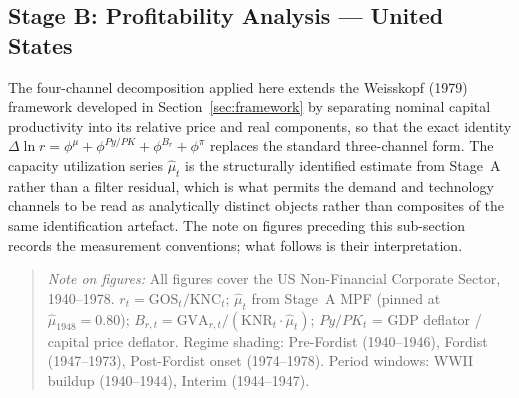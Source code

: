 
\subsection{Stage B: Profitability Analysis — United States}
\label{sec:stageB_us}


The four-channel decomposition applied here extends the Weisskopf (1979)
framework developed in Section~\ref{sec:framework} by separating nominal
capital productivity into its relative price and real components, so that
the exact identity $\Delta\ln r = \phi^{\mu} + \phi^{Py/PK} + \phi^{B_{r}}
+ \phi^{\pi}$ replaces the standard three-channel form. The capacity
utilization series $\hat{\mu}_{t}$ is the structurally identified
estimate from Stage~A rather than a filter residual, which is what
permits the demand and technology channels to be read as analytically
distinct objects rather than composites of the same identification
artefact. The note on figures preceding this sub-section records the
measurement conventions; what follows is their interpretation.

\begin{quote}\small
\textit{Note on figures:} All figures cover the US Non-Financial
Corporate Sector, 1940--1978. $r_{t} = \text{GOS}_{t}/\text{KNC}_{t}$;
$\hat{\mu}_{t}$ from Stage~A MPF (pinned at $\hat{\mu}_{1948} = 0.80$);
$B_{r,t} = \text{GVA}_{r,t}/(\text{KNR}_{t}\cdot\hat{\mu}_{t})$;
$Py/PK_{t}$ = GDP deflator / capital price deflator.
Regime shading: Pre-Fordist (1940--1946), Fordist (1947--1973),
Post-Fordist onset (1974--1978). Period windows: WWII buildup
(1940--1944), Interim (1944--1947).
\end{quote}


